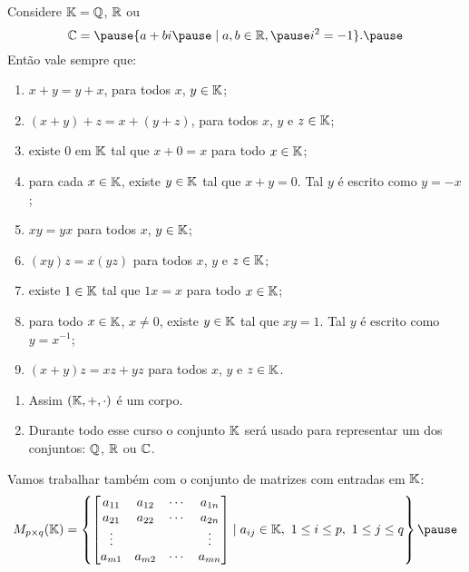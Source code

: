 \documentclass{beamer}
\begin{document}
    \begin{frame}
    
        Considere $\mathbb{K} = \mathbb{Q}$, \pause $\mathbb{R}$ \pause ou
        \[
    	    \complex = \pause \{a + bi \pause \mid a, b \in \real, \pause i^2 = -1\}.\pause
        \]
        Então vale sempre que:\pause

        \begin{enumerate}[label={\roman*})]
	    \item $x + y = y + x$, para todos $x$, $y \in \mathbb{K}$;\pause
            \item $(x + y) + z = x + (y + z)$, para todos $x$, $y$ e $z \in \mathbb{K}$;\pause
            \item existe $0$ em $\mathbb{K}$ tal que $x + 0 = x$ para todo $x \in \mathbb{K}$;\pause
            \item para cada $x \in \mathbb{K}$, existe $y \in \mathbb{K}$ tal que $x + y = 0$. Tal $y$ é escrito como $y = -x$;\pause
            \item $xy = yx$ para todos $x$, $y \in \mathbb{K}$;\pause
            \item $(xy)z = x(yz)$ para todos $x$, $y$ e $z \in \mathbb{K}$;\pause
            \item existe $1 \in \mathbb{K}$ tal que $1x = x$ para todo $x \in \mathbb{K}$;\pause
            \item para todo $x \in \mathbb{K}$, $x \ne 0$, existe $y \in \mathbb{K}$ tal que $xy =1$. Tal $y$ é escrito como $y = x^{-1}$;\pause
            \item $(x + y)z = xz + yz$ para todos $x$, $y$ e $z \in \mathbb{K}$.\pause
        \end{enumerate}
    \end{frame}
    
    \begin{frame}
        \begin{enumerate}[label={\roman*})]
            \item Assim $(\mathbb{K}, +, \cdot)$ é um corpo.\pause

            \vspace{.3cm}

            \item Durante todo esse curso o conjunto $\mathbb{K}$ será usado para representar um dos conjuntos: $\mathbb{Q}$, $\mathbb{R}$ ou $\mathbb{C}$.\pause
        \end{enumerate}
    \end{frame}

    \begin{frame}
        Vamos trabalhar também com o conjunto de matrizes com entradas em $\mathbb{K}$:\pause
        \[
            M_{p \times q}(\cp{K}) = 
            \left\{
                \begin{bmatrix}
                    a_{11} & a_{12} & \cdots & a_{1n}\\
		    a_{21} & a_{22} & \cdots & a_{2n}\\
		    \vdots & & & \vdots\\
		    a_{m1} & a_{m2} & \cdots & a_{mn}
                \end{bmatrix}
                \mid a_{ij} \in \cp{K},\ 1 \le i \le p,\ 1 \le j \le q
	    \right\}\pause
        \]
    \end{frame}
\end{document}
